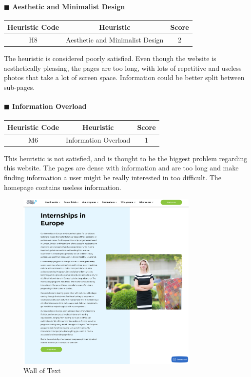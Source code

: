 \documentclass[11pt]{article} %
\begin{document}
\paragraph{$\blacksquare$ Aesthetic and Minimalist Design}
\begin{center}
    \begin{tabular}{|c|c|c|} 
    \hline
    \textbf{Heuristic Code} & \textbf{Heuristic} & \textbf{Score}\\ 
    \hline
    H8 & Aesthetic and Minimalist Design & 2 \\
    \hline
    \end{tabular}
\end{center}
The heuristic is considered poorly satisfied. Even though the website is aesthetically pleasing, the pages are too long, with lots of repetitive and useless photos that take a lot of screen space. 
Information could be better split between sub-pages. 

\paragraph{$\blacksquare$ Information Overload}
\begin{center}
    \begin{tabular}{|c|c|c|} 
    \hline
    \textbf{Heuristic Code} & \textbf{Heuristic} & \textbf{Score}\\ 
    \hline
    M6 & Information Overload & 1 \\
    \hline
    \end{tabular}
\end{center}
This heuristic is not satisfied, and is thought to be the biggest problem regarding this website. The pages are dense with information and are too long and make finding information a user might be really interested in too difficult. The homepage contains useless information. 

\begin{figure}[H]
  \centering
  \includegraphics[width=0.8\textwidth]{Images/Screenshots/Wall Of Text.png}
  \caption{Wall of Text}
\end{figure}
\end{document}
